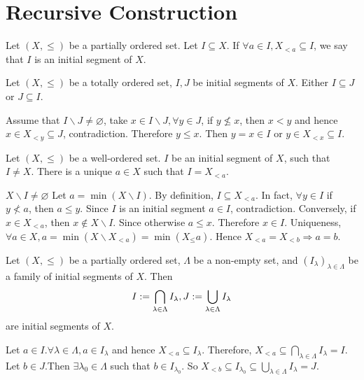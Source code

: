 \section{Recursive Construction}
\begin{definitionenv}
    Let $(X, \le)$ be a partially ordered set. Let $I\subseteq X$. If $\forall a\in I , X_{<a}\subseteq I$,  we say that $I$ is an initial segment of $X$. 
\end{definitionenv}
\begin{propositionenv}
    Let $(X, \le)$ be a totally ordered set,  $I, J$ be initial segments of $X$. Either $I\subseteq J$ or $J\subseteq I$.
\end{propositionenv}
\begin{proofenv}
    Assume that $I\backslash J\not=\varnothing$, take $x\in I\backslash J, \forall y\in J$,  if $y\not\le x $, then $x<y$ and hence $x\in X_{<y}\subseteq J$, contradiction. Therefore $y\le x$. Then $y=x\in I$ or $y\in X_{<x}\subseteq I$.
\end{proofenv}
\begin{propositionenv}
    Let $(X, \le)$ be a well-ordered set. $I$ be an initial segment of $X$,  such that $I\not=X$. There is a unique $a\in X$ such that $I=X_{<a}$.
\end{propositionenv}
\begin{proofenv}
    $X\backslash I\not=\varnothing$ Let $a=\min (X\backslash I)$. By definition, $I\subseteq X_{<a}$. In fact,  $\forall y\in I$ if $y\not< a $,  then $a\le y$.
    Since $I$ is an initial segment $a\in I$,  contradiction.
    \newline
    Conversely,  if $x\in X_{<a}$,  then $x\notin X\backslash I$. Since otherwise $a\le x$. Therefore $x\in I$. Uniqueness, $\forall a\in X, a=\min(X\backslash X_{<a})=\min(X_\leq a)$. Hence $X_{<a}=X_{<b}\Rightarrow a=b$.
\end{proofenv}
\begin{propositionenv}
    Let $(X, \le)$ be a partially ordered set,  $\Lambda$ be a non-empty set,  and $(I_\lambda)_{\lambda\in \Lambda}$ be a family of initial segments of $X$. Then 
    $$I:=\bigcap_{\lambda\in \Lambda}I_\lambda, \space J:=\bigcup_{\lambda\in \Lambda}I_\lambda$$ are initial segments of $X$.
\end{propositionenv}
\begin{proofenv}
    \quad
    \newline
    Let $a\in I.\forall \lambda\in \Lambda, a\in I_\lambda$ and hence $X_{<a}\subseteq I_\lambda$. Therefore, $X_{<a}\subseteq\bigcap_{\lambda\in\Lambda}I_\lambda=I$.
    \newline
    Let $b\in J$.Then $\exists \lambda_0\in \Lambda$ such that $b\in I_{\lambda_0}$. So $X_{<b}\subseteq I_{\lambda_0}\subseteq \bigcup_{\lambda\in \Lambda}I_\lambda=J$. 
\end{proofenv}
